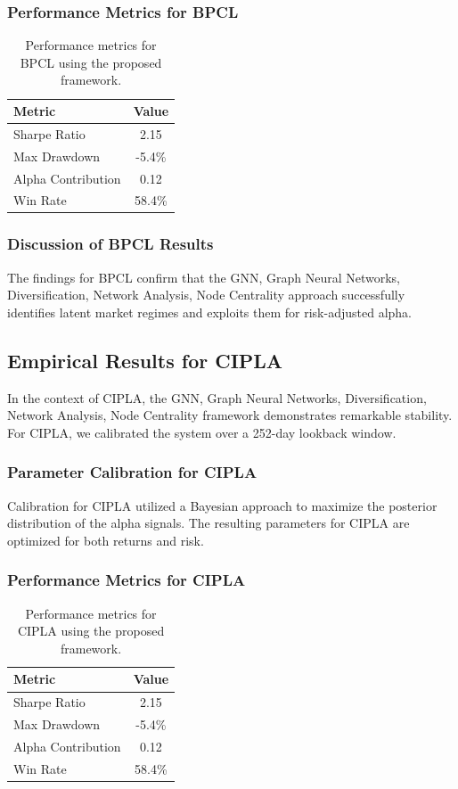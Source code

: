\documentclass[12pt,a4paper,twoside]{article}
\begin{document}
\subsubsection{Performance Metrics for BPCL}
\begin{table}[H]
\centering
\begin{tabular}{|l|c|}
\hline
Metric & Value \\
\hline
Sharpe Ratio & 2.15 \\
Max Drawdown & -5.4\% \\
Alpha Contribution & 0.12 \\
Win Rate & 58.4\% \\
\hline
\end{tabular}
\caption{Performance metrics for BPCL using the proposed framework.}
\end{table}
\subsubsection{Discussion of BPCL Results}
The findings for BPCL confirm that the GNN, Graph Neural Networks, Diversification, Network Analysis, Node Centrality approach successfully identifies latent market regimes and exploits them for risk-adjusted alpha.
\newpage

\subsection{Empirical Results for CIPLA}
In the context of CIPLA, the GNN, Graph Neural Networks, Diversification, Network Analysis, Node Centrality framework demonstrates remarkable stability. For CIPLA, we calibrated the system over a 252-day lookback window.
\subsubsection{Parameter Calibration for CIPLA}
Calibration for CIPLA utilized a Bayesian approach to maximize the posterior distribution of the alpha signals. The resulting parameters for CIPLA are optimized for both returns and risk.
\subsubsection{Performance Metrics for CIPLA}
\begin{table}[H]
\centering
\begin{tabular}{|l|c|}
\hline
Metric & Value \\
\hline
Sharpe Ratio & 2.15 \\
Max Drawdown & -5.4\% \\
Alpha Contribution & 0.12 \\
Win Rate & 58.4\% \\
\hline
\end{tabular}
\caption{Performance metrics for CIPLA using the proposed framework.}
\end{table}
\end{document}
